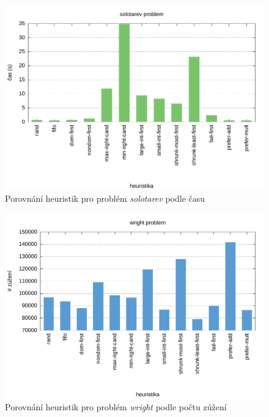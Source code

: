 {\begin{figure}[H]
\centering
\includegraphics[scale=0.68]{chart/solotarev_time.pdf}
\caption{Porovnání heuristik pro problém \emph{solotarev} podle času}
\end{figure}

\begin{figure}[H]
\centering
\includegraphics[scale=0.68]{chart/wright_nar.pdf}
\caption{Porovnání heuristik pro problém \emph{wright} podle počtu zúžení}
\end{figure}

}
